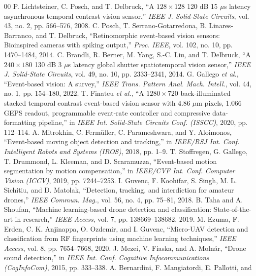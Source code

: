 \documentclass[conference]{IEEEtran}
\begin{document}
\begin{thebibliography}{00}
 P. Lichtsteiner, C. Posch, and T. Delbruck,
``A $128\times128$ 120 dB 15 $\mu$s latency asynchronous temporal
contrast vision sensor,'' \emph{IEEE J. Solid-State Circuits}, vol. 43,
no. 2, pp. 566--576, 2008.
 C. Posch, T. Serrano-Gotarredona, B. Linares-Barranco,
and T. Delbruck, ``Retinomorphic event-based vision sensors: Bioinspired
cameras with spiking output,'' \emph{Proc. IEEE}, vol. 102, no. 10,
pp. 1470--1484, 2014.
 C. Brandli, R. Berner, M. Yang, S.-C. Liu, and
T. Delbruck, ``A $240\times180$ 130 dB 3 $\mu$s latency global shutter
spatiotemporal vision sensor,'' \emph{IEEE J. Solid-State Circuits},
vol. 49, no. 10, pp. 2333--2341, 2014.
 G. Gallego \emph{et al.}, ``Event-based vision: A
survey,'' \emph{IEEE Trans. Pattern Anal. Mach. Intell.}, vol. 44, no. 1,
pp. 154--180, 2022.
 T. Finateu \emph{et al.}, ``A $1280\times720$
back-illuminated stacked temporal contrast event-based vision sensor with
4.86 $\mu$m pixels, 1.066 GEPS readout, programmable event-rate
controller and compressive data-formatting pipeline,'' in \emph{IEEE Int.
Solid-State Circuits Conf. (ISSCC)}, 2020, pp. 112--114.
 A. Mitrokhin, C. Ferm\"uller, C. Parameshwara,
and Y. Aloimonos, ``Event-based moving object detection and tracking,''
in \emph{IEEE/RSJ Int. Conf. Intelligent Robots and Systems (IROS)},
2018, pp. 1--9.
 T. Stoffregen, G. Gallego, T. Drummond,
L. Kleeman, and D. Scaramuzza, ``Event-based motion segmentation by
motion compensation,'' in \emph{IEEE/CVF Int. Conf. Computer Vision
(ICCV)}, 2019, pp. 7244--7253.
 I. Guvenc, F. Koohifar, S. Singh, M. L. Sichitiu,
and D. Matolak, ``Detection, tracking, and interdiction for amateur
drones,'' \emph{IEEE Commun. Mag.}, vol. 56, no. 4, pp. 75--81, 2018.
 B. Taha and A. Shoufan, ``Machine learning-based drone
detection and classification: State-of-the-art in research,'' \emph{IEEE
Access}, vol. 7, pp. 138669--138682, 2019.
 M. Ezuma, F. Erden, C. K. Anjinappa, O. Ozdemir, and
I. Guvenc, ``Micro-UAV detection and classification from RF fingerprints
using machine learning techniques,'' \emph{IEEE Access}, vol. 8,
pp. 7654--7668, 2020.
 J. Mezei, V. Fiaska, and A. Moln\'ar, ``Drone sound
detection,'' in \emph{IEEE Int. Conf. Cognitive Infocommunications
(CogInfoCom)}, 2015, pp. 333--338.
 A. Bernardini, F. Mangiatordi, E. Pallotti, and

\end{thebibliography}
\end{document}
